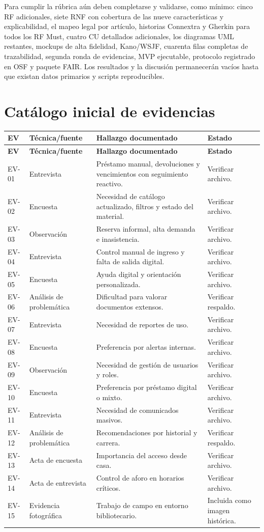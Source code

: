 \documentclass[12pt,journal,onecolumn]{IEEEtran}
\begin{document}
Para cumplir la rúbrica aún deben completarse y validarse, como mínimo: cinco RF adicionales, siete RNF con cobertura de las nueve características y explicabilidad, el mapeo legal por artículo, historias Connextra y Gherkin para todos los RF Must, cuatro CU detallados adicionales, los diagramas UML restantes, mockups de alta fidelidad, Kano/WSJF, cuarenta filas completas de trazabilidad, segunda ronda de evidencias, MVP ejecutable, protocolo registrado en OSF y paquete FAIR. Los resultados y la discusión permanecerán vacíos hasta que existan datos primarios y scripts reproducibles.

\appendices
\section{Catálogo inicial de evidencias}
\begin{longtable}{P{0.12\textwidth}P{0.23\textwidth}P{0.45\textwidth}P{0.13\textwidth}}\toprule
\textbf{EV} & \textbf{Técnica/fuente} & \textbf{Hallazgo documentado} & \textbf{Estado}\\\midrule\endfirsthead
\toprule\textbf{EV} & \textbf{Técnica/fuente} & \textbf{Hallazgo documentado} & \textbf{Estado}\\\midrule\endhead
EV-01 & Entrevista & Préstamo manual, devoluciones y vencimientos con seguimiento reactivo. & Verificar archivo.\\
EV-02 & Encuesta & Necesidad de catálogo actualizado, filtros y estado del material. & Verificar archivo.\\
EV-03 & Observación & Reserva informal, alta demanda e inasistencia. & Verificar archivo.\\
EV-04 & Entrevista & Control manual de ingreso y falta de salida digital. & Verificar archivo.\\
EV-05 & Encuesta & Ayuda digital y orientación personalizada. & Verificar archivo.\\
EV-06 & Análisis de problemática & Dificultad para valorar documentos extensos. & Verificar respaldo.\\
EV-07 & Entrevista & Necesidad de reportes de uso. & Verificar archivo.\\
EV-08 & Encuesta & Preferencia por alertas internas. & Verificar archivo.\\
EV-09 & Observación & Necesidad de gestión de usuarios y roles. & Verificar archivo.\\
EV-10 & Encuesta & Preferencia por préstamo digital o mixto. & Verificar archivo.\\
EV-11 & Entrevista & Necesidad de comunicados masivos. & Verificar archivo.\\
EV-12 & Análisis de problemática & Recomendaciones por historial y carrera. & Verificar respaldo.\\
EV-13 & Acta de encuesta & Importancia del acceso desde casa. & Verificar archivo.\\
EV-14 & Acta de entrevista & Control de aforo en horarios críticos. & Verificar archivo.\\
EV-15 & Evidencia fotográfica & Trabajo de campo en entorno bibliotecario. & Incluida como imagen histórica.\\\bottomrule
\end{longtable}
\end{document}
